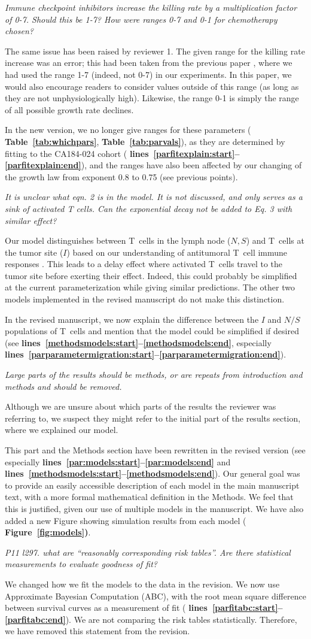 \documentclass{article}
\newcommand{\revr}[1]{{\color{gray} \itshape #1}}
\newcommand{\auth}[1]{{#1}}
\newcommand{\chng}[1]{{\color{blue!70!black} #1}}
\newcommand{\myref}[2]{{\bfseries\color{red!70!black} Figure~\ref{#1}#2}}
\newcommand{\mytref}[1]{{\bfseries\color{red!70!black} Table~\ref{#1}}}
\newcommand{\lr}[1]{{\bfseries\color{red!70!black} lines~\ref{#1:start}--\ref{#1:end}}}
\newcommand{\killingranges}[1]{
\auth{The same issue has been raised by reviewer #1. The given range for the killing rate increase was an error; this had been taken from the previous paper \cite{Creemers2021}, where we had used the range 1-7 (indeed, not 0-7) in our experiments. In this paper, we would also encourage readers to consider values outside of this range (as long as they are not unphysiologically high). Likewise, the range 0-1 is simply the range of all possible growth rate declines.}

\chng{
In the new version, we no longer give ranges for these parameters (\mytref{tab:whichpars}, \mytref{tab:parvals}), as they are determined by fitting to the CA184-024 cohort (\lr{parfitexplain}), and the ranges have also been affected by our changing of the growth law from exponent 0.8 to 0.75 (see previous points).
}
}
\begin{document}
\revr{Immune checkpoint inhibitors increase the killing rate by a multiplication factor of 0-7. Should this be 1-7? How were ranges 0-7 and 0-1 for chemotherapy chosen?}

\killingranges{1}

\revr{It is unclear what eqn. 2 is in the model. It is not discussed, and only serves as a sink of activated T cells. Can the exponential decay not be added to Eq. 3 with similar effect?}

\auth{Our model distinguishes between T~cells in the lymph node ($N,S$) and T~cells at the tumor site ($I$) based on our understanding of antitumoral T~cell immune responses \cite{Creemers2021}. This leads to a delay effect where activated T~cells travel to the tumor site before exerting their effect. Indeed, this could probably be simplified at the current parameterization while giving similar predictions. The other two models implemented in the revised manuscript do not make this distinction.}

\chng{In the revised manuscript, we now explain the difference between the $I$ and $N/S$ populations of T~cells and mention that the model could be simplified if desired (see \lr{methodsmodels}, especially \lr{parparametermigration}).}

\revr{
Large parts of the results should be methods, or are repeats from introduction and methods and should be removed.
}


\auth{Although we are unsure about which parts of the results the reviewer was referring to, we suspect they might refer to the initial part of the results section, where we explained our model.}

\chng{This part and the Methods section have been rewritten in the revised version (see especially \lr{par:models} and \lr{methodsmodels}). Our general goal was to provide an easily accessible description of each model in the main manuscript text, with a more formal mathematical definition in the Methods. We feel that this is justified, given our use of multiple models in the manuscript. We have also added a new Figure showing simulation results from each model (\myref{fig:models}).}

\revr{
P11 l297. what are “reasonably corresponding risk tables”. Are there statistical measurements to evaluate goodness of fit?}

\chng{
We changed how we fit the models to the data in the revision. We now use Approximate Bayesian Computation (ABC), with the root mean square difference between survival curves as a measurement of fit (\lr{parfitabc}). We are not comparing the risk tables statistically. Therefore, we have removed this statement from the revision.
}
\end{document}
